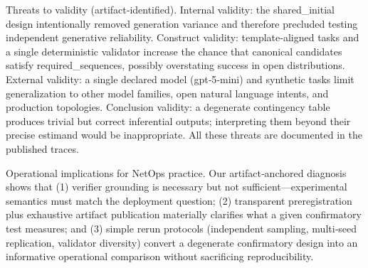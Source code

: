 \documentclass[conference]{IEEEtran}
\begin{document}
Threats to validity (artifact‑identified). Internal validity: the shared\_initial design intentionally removed generation variance and therefore precluded testing independent generative reliability. Construct validity: template‑aligned tasks and a single deterministic validator increase the chance that canonical candidates satisfy required\_sequences, possibly overstating success in open distributions. External validity: a single declared model (gpt‑5‑mini) and synthetic tasks limit generalization to other model families, open natural language intents, and production topologies. Conclusion validity: a degenerate contingency table produces trivial but correct inferential outputs; interpreting them beyond their precise estimand would be inappropriate. All these threats are documented in the published traces.

Operational implications for NetOps practice. Our artifact‑anchored diagnosis shows that (1) verifier grounding is necessary but not sufficient---experimental semantics must match the deployment question; (2) transparent preregistration plus exhaustive artifact publication materially clarifies what a given confirmatory test measures; and (3) simple rerun protocols (independent sampling, multi‑seed replication, validator diversity) convert a degenerate confirmatory design into an informative operational comparison without sacrificing reproducibility.
\end{document}
